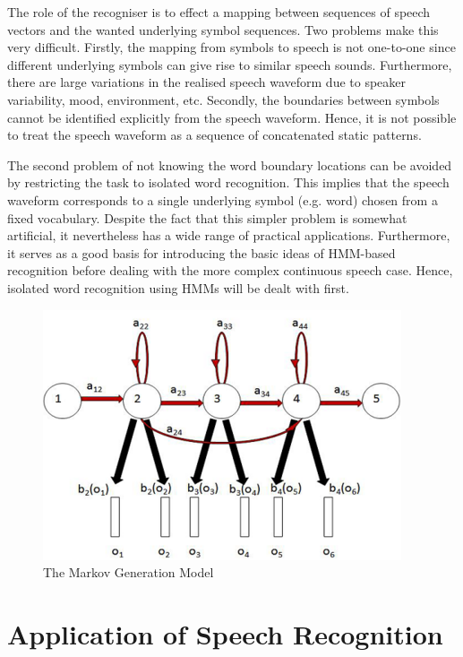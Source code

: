 \documentclass[12pt,a4paper,oldfontcommands]{memoir}
\begin{document}
The role of the recogniser is to effect a mapping between sequences of speech vectors and the wanted underlying symbol sequences. Two problems make this very difficult. Firstly, the mapping from symbols to speech is not one-to-one since different underlying symbols can give rise to similar speech sounds. Furthermore, there are large variations in the realised speech waveform due to speaker variability, mood, environment, etc.  Secondly, the boundaries between symbols cannot be identified explicitly from the speech waveform. Hence, it is not possible to treat the speech waveform as a sequence of concatenated static patterns. 

The second problem of not knowing the word boundary locations can be avoided by restricting the task to isolated word recognition. This implies that the speech waveform corresponds to a single underlying symbol (e.g. word) chosen from a fixed vocabulary. Despite the fact that this simpler problem is somewhat artificial, it nevertheless has a wide range of practical applications. Furthermore, it serves as a good basis for introducing the basic ideas of HMM-based recognition before dealing with the more complex continuous speech case. Hence, isolated word recognition using HMMs will be dealt with first.

\begin{figure}[h]
    \centering
    \includegraphics[scale=1.0]{400px-Mfcc_fig5}
    \caption{The Markov Generation Model}
\end{figure}


\section{Application of Speech Recognition}
\end{document}
